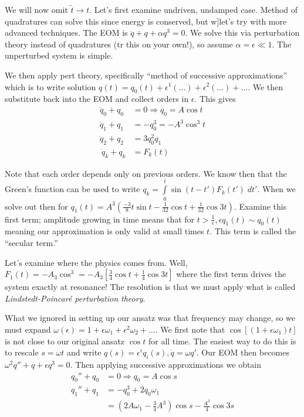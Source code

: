 \documentclass[10pt]{report}
\begin{document}
We will now omit $\tilde{t} \to t$. Let's first examine undriven, undamped case. Method of quadratures can solve this since energy is conserved, but w]let's try with more advanced techniques. The EOM is $\ddot{q} + q + \alpha q^3 = 0$. We solve this via perturbation theory instead of quadratures (tr this on your own!), so assume $\alpha = \epsilon \ll 1$. The unperturbed system is simple. 

We then apply pert theory, specifically ``method of successive approximations'' which is to write solution $q(t) = q_0(t) + \epsilon^1(\dots) + \epsilon^2(\dots) + \dots$. We then substitute back into the EOM and collect orders in $\epsilon$. This gives
\begin{align}
    \ddot{q}_0 + q_0 &= 0 \Rightarrow q_0 = A\cos t\\
    \ddot{q}_1 + q_1 &= -q_0^3 = -A^3\cos^3t\\
    \ddot{q}_2 + q_2 &= 3q_0^2 q_1\\\
    \ddot{q}_k + q_k &= F_k(t)
\end{align}

Note that each order depends only on previous orders. We know then that the Green's function can be used to write $q_k = \displaystyle\int\limits_{0}^{t}\sin(t-t')F_k(t')\;dt'$. When we solve out then for $q_1(t) = A^3\left( \frac{-3}{8}t\sin t - \frac{1}{32}\cos t + \frac{1}{32}\cos 3t\right)$. Examine this first term; amplitude growing in time means that for $t > \frac{1}{\epsilon}, \epsilon q_1(t) \sim q_0(t)$ meaning our approximation is only valid at small times $t$. This term is called the ``secular term.''

Let's examine where the physics comes from. Well, $F_1(t) = -A_3\cos^3 = -A_3\left[ \frac{3}{4}\cos t + \frac{1}{4}\cos 3t \right]$ where the first term drives the system exactly at resonance! The resolution is that we must apply what is called \emph{Lindstedt-Poincar\'e perturbation theory}.

What we ignored in setting up our ansatz was that frequency may change, so we must expand $\omega(\epsilon) = 1 + \epsilon\omega_1 + \epsilon^2\omega_2 +\dots$. We first note that $\cos[(1+\epsilon\omega_1)t]$ is not close to our original ansatz $\cos t$ for all time. The easiest way to do this is to rescale $s = \omega t$ and write $q(s) = \epsilon^i q_i(s), \dot{q} = \omega q'$. Our EOM then becomes $\omega^2 q'' + q + \epsilon q^3 = 0$. Then applying successive approximations we obtain
\begin{align}
    q_0'' + q_0 &= 0 \Rightarrow q_0 = A\cos s\\
    q_1'' + q_1 &= -q_0^3 + 2q_0\omega_1 \\
    &= \left( 2A\omega_1 - \frac{3}{4}A^3 \right)\cos s - \frac{A^3}{4}\cos 3s
\end{align}
\end{document}
